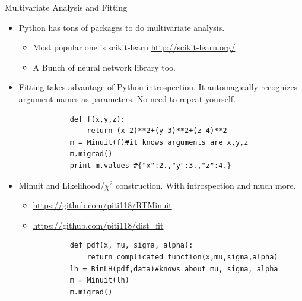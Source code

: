 \documentclass{beamer}
\begin{document}
\begin{frame}[fragile, shrink=5]{Multivariate Analysis and Fitting}
	\begin{itemize}
	\item Python has tons of packages to do multivariate analysis.
		\begin{itemize}
			\item Most popular one is scikit-learn
				\url{http://scikit-learn.org/}
			\item A Bunch of neural network library too.
		\end{itemize}
	\item Fitting takes advantage of Python introspection. It
	automagically recognizes argument names as parameters. No need to repeat
	yourself.
		\begin{verbatim}
			def f(x,y,z):
			    return (x-2)**2+(y-3)**2+(z-4)**2
			m = Minuit(f)#it knows arguments are x,y,z
			m.migrad()
			print m.values #{"x":2.,"y":3.,"z":4.}
		\end{verbatim}
	\item Minuit and Likelihood/$\chi^2$ construction. With introspection and much more.
		\begin{itemize}
			\item \url{https://github.com/piti118/RTMinuit}
			\item \url{https://github.com/piti118/dist_fit}
				
		\end{itemize}
		\begin{verbatim}
			def pdf(x, mu, sigma, alpha):
			    return complicated_function(x,mu,sigma,alpha)
			lh = BinLH(pdf,data)#knows about mu, sigma, alpha
			m = Minuit(lh)
			m.migrad()
		\end{verbatim}
	\end{itemize}
\end{frame}
\end{document}
